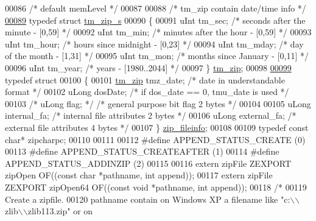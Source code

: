 \begin{DoxyCode}
00086 \textcolor{comment}{/* default memLevel */}
00087 
00088 \textcolor{comment}{/* tm\_zip contain date/time info */}
\hyperlink{structtm__zip__s}{00089} \textcolor{keyword}{typedef} \textcolor{keyword}{struct }\hyperlink{structtm__zip__s}{tm\_zip\_s}
00090 \{
00091     uInt tm\_sec;            \textcolor{comment}{/* seconds after the minute - [0,59] */}
00092     uInt tm\_min;            \textcolor{comment}{/* minutes after the hour - [0,59] */}
00093     uInt tm\_hour;           \textcolor{comment}{/* hours since midnight - [0,23] */}
00094     uInt tm\_mday;           \textcolor{comment}{/* day of the month - [1,31] */}
00095     uInt tm\_mon;            \textcolor{comment}{/* months since January - [0,11] */}
00096     uInt tm\_year;           \textcolor{comment}{/* years - [1980..2044] */}
00097 \} \hyperlink{structtm__zip__s}{tm\_zip};
00098 
\hyperlink{structzip__fileinfo}{00099} \textcolor{keyword}{typedef} \textcolor{keyword}{struct}
00100 \{
00101     \hyperlink{structtm__zip__s}{tm\_zip}      tmz\_date;       \textcolor{comment}{/* date in understandable format           */}
00102     uLong       dosDate;       \textcolor{comment}{/* if dos\_date == 0, tmu\_date is used      */}
00103 \textcolor{comment}{/*    uLong       flag;        */}   \textcolor{comment}{/* general purpose bit flag        2 bytes */}
00104 
00105     uLong       internal\_fa;    \textcolor{comment}{/* internal file attributes        2 bytes */}
00106     uLong       external\_fa;    \textcolor{comment}{/* external file attributes        4 bytes */}
00107 \} \hyperlink{structzip__fileinfo}{zip\_fileinfo};
00108 
00109 \textcolor{keyword}{typedef} \textcolor{keyword}{const} \textcolor{keywordtype}{char}* zipcharpc;
00110 
00111 
00112 \textcolor{preprocessor}{#define APPEND\_STATUS\_CREATE        (0)}
00113 \textcolor{preprocessor}{#define APPEND\_STATUS\_CREATEAFTER   (1)}
00114 \textcolor{preprocessor}{#define APPEND\_STATUS\_ADDINZIP      (2)}
00115 
00116 \textcolor{keyword}{extern} zipFile ZEXPORT zipOpen OF((\textcolor{keyword}{const} \textcolor{keywordtype}{char} *pathname, \textcolor{keywordtype}{int} append));
00117 \textcolor{keyword}{extern} zipFile ZEXPORT zipOpen64 OF((\textcolor{keyword}{const} \textcolor{keywordtype}{void} *pathname, \textcolor{keywordtype}{int} append));
00118 \textcolor{comment}{/*}
00119 \textcolor{comment}{  Create a zipfile.}
00120 \textcolor{comment}{     pathname contain on Windows XP a filename like "c:\(\backslash\)\(\backslash\)zlib\(\backslash\)\(\backslash\)zlib113.zip" or on}

\end{DoxyCode}
